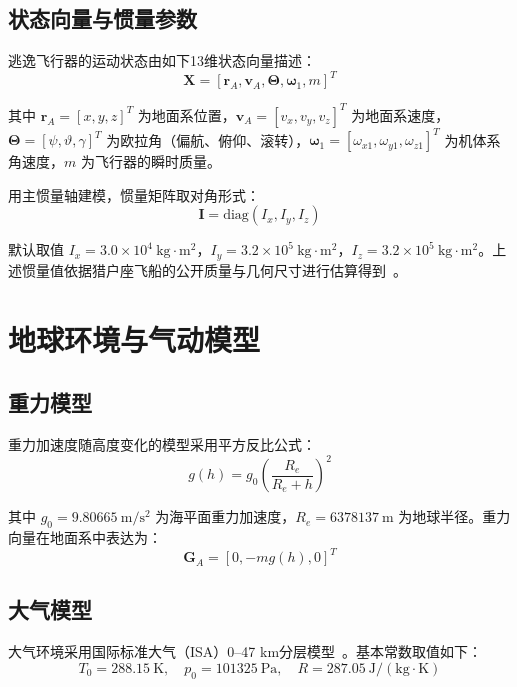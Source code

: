 \subsection{状态向量与惯量参数}

逃逸飞行器的运动状态由如下13维状态向量描述：
\begin{equation}
\mathbf X=[\mathbf r_A,\mathbf v_A,\boldsymbol\Theta,\boldsymbol\omega_1,m]^T 
\end{equation}

其中 $\mathbf r_A=[x,y,z]^T$ 为地面系位置，$\mathbf v_A=[v_x,v_y,v_z]^T$ 为地面系速度，$\boldsymbol\Theta=[\psi,\vartheta,\gamma]^T$ 为欧拉角（偏航、俯仰、滚转），$\boldsymbol\omega_1=[\omega_{x1},\omega_{y1},\omega_{z1}]^T$ 为机体系角速度，$m$ 为飞行器的瞬时质量。

用主惯量轴建模，惯量矩阵取对角形式：
\begin{equation}
\mathbf I=\mathrm{diag}(I_x,I_y,I_z) 
\end{equation}

默认取值 $I_x=3.0\times10^4\ \mathrm{kg\cdot m^2}$，$I_y=3.2\times10^5\ \mathrm{kg\cdot m^2}$，$I_z=3.2\times10^5\ \mathrm{kg\cdot m^2}$。上述惯量值依据猎户座飞船的公开质量与几何尺寸进行估算得到~\cite{mcgowan2011overview}。

\section{地球环境与气动模型}

\subsection{重力模型}

重力加速度随高度变化的模型采用平方反比公式：
\begin{equation}
g(h)=g_0\left(\frac{R_e}{R_e+h}\right)^2 
\end{equation}

其中 $g_0=9.80665\ \mathrm{m/s^2}$ 为海平面重力加速度，$R_e=6378137\ \mathrm m$ 为地球半径。重力向量在地面系中表达为：
\begin{equation}
\mathbf G_A=[0,-mg(h),0]^T 
\end{equation}

\subsection{大气模型}

大气环境采用国际标准大气（ISA）0--47 km分层模型~\cite{ISA}。基本常数取值如下：
\begin{equation}
T_0=288.15\ \mathrm K,\quad p_0=101325\ \mathrm{Pa},\quad R=287.05\ \mathrm{J/(kg\cdot K)}
\end{equation}

